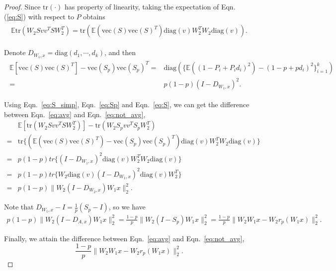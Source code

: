 \documentclass[11pt]{article}
\begin{document}
\begin{proof}
Since $\text{tr}(\cdot)$ has property of linearity, taking the expectation of Eqn. (\ref{eq:S}) with respect to $P$ obtains
\begin{align}
\begin{split}
\mathbb{E}\text{tr}(W_2Svv^TSW_2^T)=\text{tr}(\mathbb{E}(\text{vec}(S)\text{vec}(S)^T)\text{diag}(v)W_2^TW_2\text{diag}(v)).
\end{split}
\label{eq:S_part}
\end{align}

Denote $D_{W_1,x}= \text{diag}(d_1,\cdots,d_k)$, and then
\begin{align}
\begin{split}
\mathbb{E}[\text{vec}(S)\text{vec}(S)^T]-\text{vec}(S_p)\text{vec}(S_p)^T
 =& \text{diag}(\{\mathbb{E}((1-P_i+P_id_i)^2)-(1-p+pd_i)^2\}_{i=1}^k)
\\ =& p(1-p)(I-D_{W_1,x})^2.
\end{split}
\label{eq:S_simp}
\end{align}

Using Eqn.~\eqref{eq:S_simp}, Eqn.~\eqref{eq:Sp} and Eqn.~\eqref{eq:S}, we can get the difference between Eqn.~\eqref{eq:avg} and Eqn.~\eqref{eq:not_avg},
\begin{align*}
&  \mathbb{\mathbb{E}}[\text{tr}(W_2Svv^TSW_2^T)] - \text{tr}(W_2S_pvv^TS_pW_2^T)
\\ =& \text{tr}\{(\mathbb{E}(\text{vec}(S)\text{vec}(S)^T)-\text{vec}(S_p)\text{vec}(S_p)^T)\text{diag}(v)W_2^TW_2\text{diag}(v)\}
\\ =& p(1-p)tr\{(I-D_{W_1,x})^2\text{diag}(v)W_2^TW_2\text{diag}(v)\}
\\ =& p(1-p)tr\{W_2\text{diag}(v)(I-D_{W_1,x})^2\text{diag}(v)W_2^T\}
\\ =& p(1-p)\|W_2(I-D_{W_2,x})W_1x\|_2^2.
\end{align*}

Note that $D_{W_1,x} - I = \frac{1}{p}(S_p - I)$, so we have
\begin{align*}
p(1-p)\|W_2(I-D_{A,x})W_1x\|_2^2
= \frac{1-p}{p} \|W_2(I-S_p)W_1x\|_2^2
=  \frac{1-p}{p} \|W_2W_1x-W_2r_p(W_1x)\|_2^2.
\end{align*}

Finally, we attain the difference between Eqn.~\eqref{eq:avg} and Eqn.~\eqref{eq:not_avg},
$$\frac{1-p}{p} \|W_2W_1x-W_2r_p(W_1x)\|_2^2.$$
\end{proof}
\end{document}
